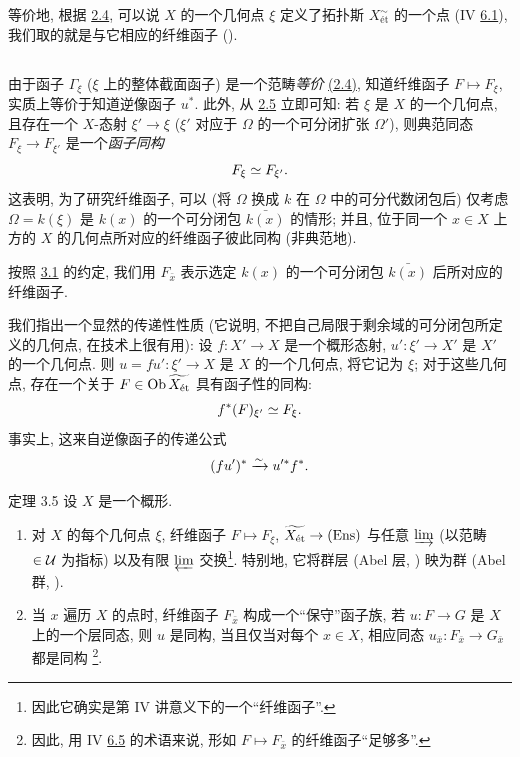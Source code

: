等价地, 根据 \hyperref[VIII.cor2.4]{2.4},
可以说 $X$ 的一个几何点 $\xi$ 定义了拓扑斯 $X^{\sim}_{\text{ét}}$
的一个点 (IV \hyperref[IV.def6.1]{6.1}),
我们取的就是与它相应的纤维函子 (\loccit).

\setcounter{subsection}{3}
\subsection{}

由于\pageoriginale 函子 $\Gamma_{\xi}$ ($\xi$ 上的整体截面函子)
是一个范畴\emph{等价} \hyperref[VIII.cor2.4]{(2.4)},
知道纤维函子 $F\mapsto F_{\xi}$,
实质上等价于知道逆像函子 $u^{\ast}$.
此外, 从 \hyperref[VIII.cor2.5]{2.5} 立即可知:
若 $\xi$ 是 $X$ 的一个几何点, 且存在一个 $X$-态射 $\xi'\to\xi$
(\ie $\xi'$ 对应于 $\Omega$ 的一个可分闭扩张 $\Omega'$),
则典范同态 $F_{\xi}\to F_{\xi'}$ 是一个\emph{函子同构}
$$
F_{\xi} \simeq F_{\xi'}{}.
$$
这表明, 为了研究纤维函子,
可以 (将 $\Omega$ 换成 $k$ 在 $\Omega$ 中的可分代数闭包后)
仅考虑 $\Omega = k(\xi)$ 是 $k(x)$ 的一个可分闭包 $\bar{k(x)}$ 的情形;
并且, 位于同一个 $x \in X$ 上方的 $X$ 的几何点所对应的纤维函子彼此同构
(非典范地).

按照 \hyperref[VIII.subsec3.1]{3.1} 的约定,
我们用 $F_{\bar{x}}$ 表示选定 $k(x)$ 的一个可分闭包
$\bar{k(x)}$ 后所对应的纤维函子.

我们指出一个显然的传递性性质
(它说明, 不把自己局限于剩余域的可分闭包所定义的几何点, 在技术上很有用):
设 $f : X'\to X$ 是一个概形态射,
$u' : \xi'\to X'$ 是 $X'$ 的一个几何点.
则 $u = f u': \xi'\to X$ 是 $X$ 的一个几何点, 将它记为 $\xi$;
对于这些几何点, 存在一个关于 $F \in \operatorname{Ob} \widetilde{X_{\text{ét}}}$
具有函子性的同构:
$$
f^{\ast} (F)_{\xi'} \simeq F_{\xi}{}.
$$
事实上, 这\pageoriginale 来自逆像函子的传递公式
$$
(fu')^{\ast} \xrightarrow{\sim} u'^{\ast} f^{\ast}{}.
$$

\begin{enonce*}{定理 3.5}
设 $X$ 是一个概形.
\begin{enumerate}
\renewcommand{\theenumi}{\alph{enumi}}
\renewcommand{\labelenumi}{\theenumi)}
\item 对 $X$ 的每个几何点 $\xi$,
纤维函子 $F \mapsto F_{\xi}$,
$\widetilde{X_{\text{\rm ét}}} \to (\Ens)$
与任意 $\varinjlim$ (以范畴 $\in {\mathcal U}$ 为指标)
以及有限 $\varprojlim$ 交换\footnote{因此它确实是第 IV 讲意义下的一个“纤维函子”.}.
特别地, 它将群层 (\resp Abel 层, \etc)
映为群 (\resp Abel 群, \etc).

\item 当 $x$ 遍历 $X$ 的点时,
纤维函子 $F_{\bar{x}}$ 构成一个“保守”函子族,
\ie 若 $u : F \to G$ 是 $X$ 上的一个层同态,
则 $u$ 是同构, 当且仅当对每个 $x \in X$,
相应同态 $u_{\bar{x}} : F_{\bar{x}} \to G_{\bar{x}}$ 都是同构
\footnote{因此, 用 IV \hyperref[IV.prop6.5]{6.5} 的术语来说,
形如 $F \mapsto F_{\bar{x}}$ 的纤维函子“足够多”.}.
\end{enumerate}
\end{enonce*}

